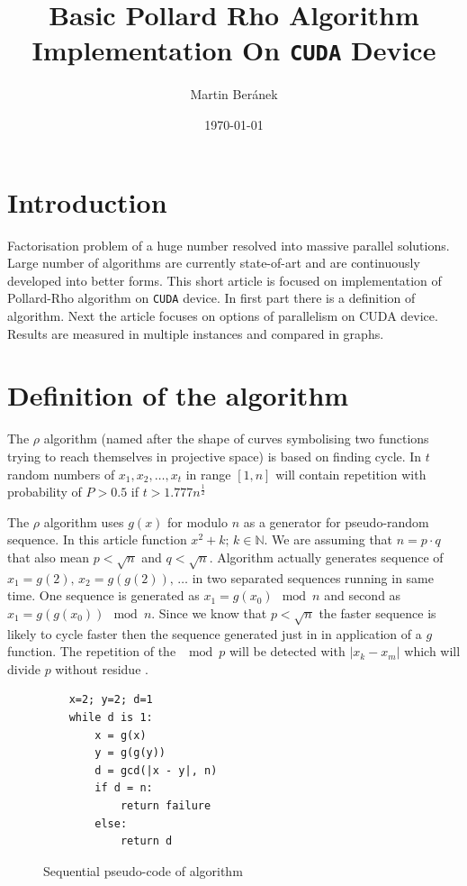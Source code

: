 \documentclass[a4paper]{article}
\begin{document}
\title{Basic Pollard Rho Algorithm Implementation On \texttt{CUDA} Device}
\author{Martin Beránek}
\date{\today}
\maketitle

\tableofcontents
\listoffigures
\newpage

\section{Introduction}

Factorisation problem of a huge number resolved into massive parallel solutions. Large number of algorithms are currently state-of-art and are continuously developed into better forms. This short article is focused on implementation of Pollard-Rho algorithm on \texttt{CUDA} device. In first part there is a definition of algorithm. Next the article focuses on options of parallelism on CUDA device. Results are measured in multiple instances and compared in graphs. 

\section{Definition of the algorithm}

The $\rho$ algorithm (named after the shape of curves symbolising two functions trying to reach themselves in projective space) is based on finding cycle. In $t$ random numbers of $x_1, x_2, \dots, x_t$ in range $[1, n]$ will contain repetition with probability of $P > 0.5$ if $t > 1.777n^{\frac{1}{2}}$

The $\rho$ algorithm uses $g(x)$ for modulo $n$ as a generator for pseudo-random sequence. In this article function $x^2 + k;\, k \in \mathbb{N}$. We are assuming that $n = p \cdot q$ that also mean $p < \sqrt{n}$ and $q < \sqrt{n}$. Algorithm actually generates sequence of $x_1 = g(2),\,x_2 = g(g(2)),\,\dots$ in two separated sequences running in same time. One sequence is generated as $x_1=g(x_0) \mod n$ and second as $x_1=g(g(x_0)) \mod n$. Since we know that $p < \sqrt{n}$ the faster sequence is likely to cycle faster then the sequence generated just in in application of a $g$ function. The repetition of the $\mod p$ will be detected with $| x_k - x_m |$ which will divide $p$ without residue \cite{wiki}.

\begin{figure}[H]
	\centering
	\begin{lstlisting}
    x=2; y=2; d=1
    while d is 1:
        x = g(x)
        y = g(g(y))
        d = gcd(|x - y|, n)
        if d = n: 
            return failure
        else:
            return d
	\end{lstlisting}
	\caption{Sequential pseudo-code of algorithm}
	\label{singl_alg}
\end{figure}
\end{document}
